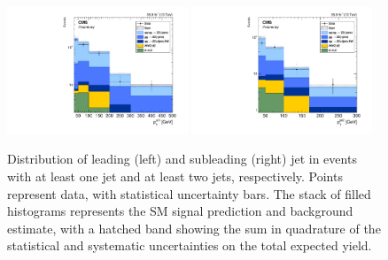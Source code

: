 \begin{figure}[htbp]
  \begin{center}
    \includegraphics[width=0.48\textwidth]{results/j1Pt.pdf}
    \includegraphics[width=0.48\textwidth]{results/j2Pt.pdf}
    \caption[Transverse momentum of the leading and subleading jets]{
        Distribution of leading (left) and subleading (right) jet {\pt} in {\ZZ} events with at least one jet and at least two jets, respectively.
        Points represent data, with statistical uncertainty bars.
        The stack of filled histograms represents the SM signal prediction and background estimate, with a hatched band showing the sum in quadrature of the statistical and systematic uncertainties on the total expected yield.
      }\label{fig:jetPt}
  \end{center}
\end{figure}

